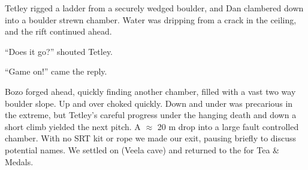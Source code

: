 
Tetley rigged a ladder from a securely wedged boulder, and Dan clambered
down into a boulder strewn chamber. Water was dripping from a crack in
the ceiling, and the rift continued ahead. 

``Does it go?'' shouted
Tetley. 

``Game on!'' came the reply.

Bozo forged ahead, quickly finding another chamber, filled with a vast
two way boulder slope. Up and over choked quickly. Down and under was
precarious in the extreme, but Tetley's careful progress under the
hanging death and down a short climb yielded the next pitch. A
$\approx$ 20 m drop into a large fault controlled chamber. With no
SRT kit or rope we made our exit, pausing briefly to discuss potential
names. We settled on  (Veela cave) and returned to the 
for Tea \& Medals. 


